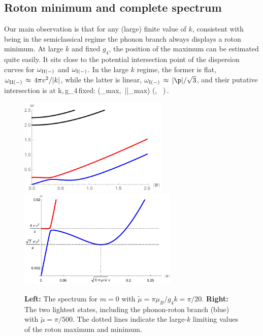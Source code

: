 \subsection{Roton minimum and complete spectrum}
Our main observation is that for any (large) finite value of $k$, consistent with being in the semiclassical regime the phonon branch always displays a roton minimum. 
At large $k$ and fixed $g_4$, the position of the maximum can be estimated quite easily. It sits close to the potential intersection point of the dispersion curves for $\omega_{\rm II(-)}$ and $\omega_{\rm I (-)}$. In the large $k$ regime, the former is flat, $\omega_{\rm II(-)}\,\approx\, 4\pi v^2/|k|$, while the latter is linear, $\omega_{\rm I(-)} \,\approx\, |\p|/\sqrt{3}$, and their putative intersection is at 
\be
k,\,g_4\,{\rm fixed}: \qquad \left(\rm \omega_{\rm max},\, |\p|_{\rm max}\right)\,\approx\,\left(, \, \right)\,.
\ee
\begin{figure}[h]
\begin{center}
\includegraphics[width=2.8in]{Chapter_3_Folder_1806.06976/figures/spectrumk20.pdf}\hspace{0.1in}\includegraphics[width=3.0in]{Chapter_3_Folder_1806.06976/figures/rotonk500.pdf}
\end{center}
\caption{ \small{{\bf Left:} The spectrum for $m=0$ with $\tilde\mu =\pi \mu_{B}/g_4 k =\pi/20 $. {\bf Right:} The two lightest states, including the phonon-roton branch (blue) with $\tilde\mu=\pi/500$. The dotted lines indicate the large-$k$ limiting values of the roton maximum and minimum.
}}
\label{largek}
\end{figure}
